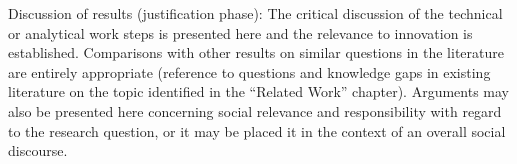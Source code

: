 Discussion of results (justification phase): The critical discussion of the technical or analytical work steps is
presented here and the relevance to innovation is established. Comparisons with other results on similar
questions in the literature are entirely appropriate (reference to questions and knowledge gaps in existing literature on the topic identified in the “Related Work” chapter). Arguments may also be presented here concerning
social relevance and responsibility with regard to the research question, or it may be placed it in the
context of an overall social discourse.